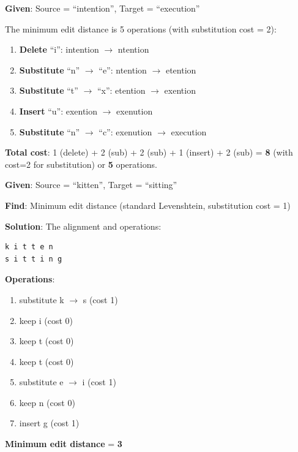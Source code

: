 \documentclass[11pt,a4paper]{article}
\begin{document}
\begin{tcolorbox}[colback=green!5!white,colframe=green!75!black,title=\textbf{Worked Example 14: Edit Distance -- intention to execution}]
\textbf{Given}: Source = ``intention'', Target = ``execution''

The minimum edit distance is 5 operations (with substitution cost = 2):
\begin{enumerate}
    \item \textbf{Delete} ``i'': intention $\to$ ntention
    \item \textbf{Substitute} ``n'' $\to$ ``e'': ntention $\to$ etention
    \item \textbf{Substitute} ``t'' $\to$ ``x'': etention $\to$ exention
    \item \textbf{Insert} ``u'': exention $\to$ exenution
    \item \textbf{Substitute} ``n'' $\to$ ``c'': exenution $\to$ execution
\end{enumerate}
\textbf{Total cost}: 1 (delete) + 2 (sub) + 2 (sub) + 1 (insert) + 2 (sub) = \textbf{8} (with cost=2 for substitution) or \textbf{5} operations.
\end{tcolorbox}

\begin{tcolorbox}[colback=green!5!white,colframe=green!75!black,title=\textbf{Worked Example 15: Edit Distance -- kitten to sitting}]
\textbf{Given}: Source = ``kitten'', Target = ``sitting''

\textbf{Find}: Minimum edit distance (standard Levenshtein, substitution cost = 1)

\textbf{Solution}:
The alignment and operations:
\begin{verbatim}
k i t t e n
s i t t i n g
\end{verbatim}

\textbf{Operations}:
\begin{enumerate}
    \item substitute k $\to$ s (cost 1)
    \item keep i (cost 0)
    \item keep t (cost 0)
    \item keep t (cost 0)
    \item substitute e $\to$ i (cost 1)
    \item keep n (cost 0)
    \item insert g (cost 1)
\end{enumerate}

\textbf{Minimum edit distance} = \textbf{3}
\end{tcolorbox}
\end{document}
